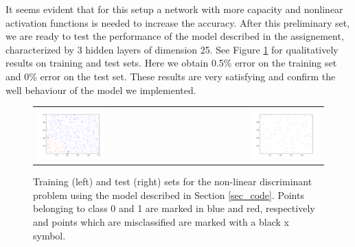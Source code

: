 \documentclass{article}
\begin{document}
It seems evident that for this setup a network with more capacity and nonlinear activation functions is needed to increase the accuracy.
After this preliminary set, we are ready to test the performance of  the model described in the assignement, characterized by 3 hidden layers of dimension 25. See Figure \ref{fig_circle_good} for qualitatively results on training and test sets.
Here we obtain 0.5\% error on the training set and 0\% error on the test set.
These results are very satisfying and confirm the well behaviour of the model we implemented. 
  \begin{figure}[h]
 \begin{center}
\begin{tabular}{l r}
  \includegraphics[width=0.5\textwidth]{fig/fig_circ_ourmodel_05err_train} & 
  \includegraphics[width=0.5\textwidth]{fig/fig_circ_ourmodel_0err_test} \\
  \end{tabular}
   \caption{Training (left) and test (right) sets for the non-linear discriminant problem using the model described in Section \ref{sec_code}. Points belonging to class 0 and 1 are marked in blue and red, respectively and  points which are misclassified are marked with a black x symbol.  \label{fig_circle_good}}
  \end{center}
  \end{figure}

\end{document}
